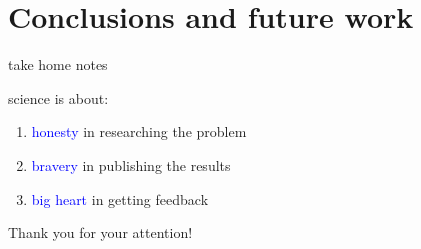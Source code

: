 \documentclass[10pt]{beamer}
\begin{document}
\section{Conclusions and future work}

\begin{frame}{take home notes}

\begin{center}science is about:\end{center}

\begin{center}
\begin{enumerate}
	\item \textcolor{blue}{honesty} in researching the problem
	\item \textcolor{blue}{bravery} in publishing the results 
    \item \textcolor{blue}{big heart} in getting feedback 
\end{enumerate}
\end{center}
\end{frame}

\begin{frame}[standout]
\begin{center}
Thank you for your attention!
\end{center}
\end{frame}
\end{document}
